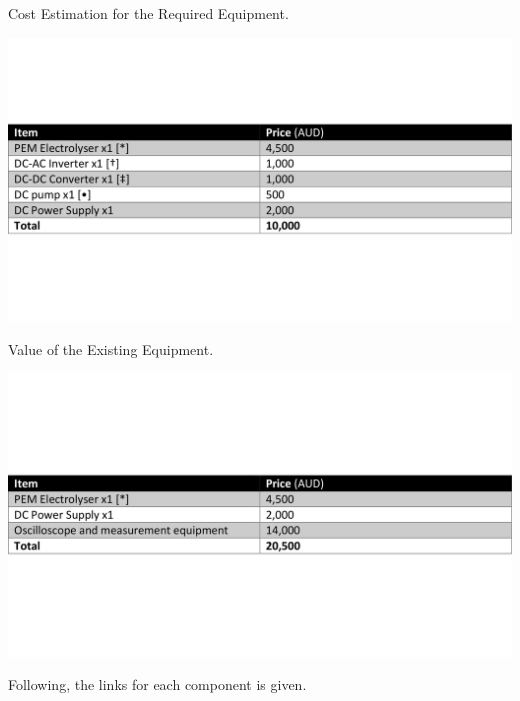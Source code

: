 \documentclass[1pt]{extarticle}
\begin{document}
    \begin{table}[h!]
        \centering
        \caption{Cost Estimation for the Required Equipment.}
        \vspace{-2.5mm}
        \label{TBL1}
            \includegraphics[clip,trim= 0cm 5.5cm 0cm 5.5cm,width=1\linewidth]{images/TBL1.pdf}
        \vspace{-6mm}
    \end{table}

    \begin{table}[h!]
        \centering
        \caption{Value of the Existing Equipment.}
        \vspace{-2.5mm}
        \label{TBL2}
            \includegraphics[clip,trim= 0cm 6.5cm 0cm 6.5cm,width=1\linewidth]{images/TBL2.pdf}
        \vspace{-6mm}
    \end{table}

Following, the links for each component is given.
\end{document}
